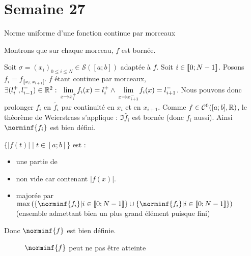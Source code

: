 \documentclass{article}
\renewenvironment{question_kholle}[2][ ]
{
	\subsection{\texorpdfstring{#2}{}}
	\notblank{#1}
	{
		\noindent #1
		\bigbreak
	}
	{}
	\begin{proof}
}
{
	\end{proof}
}
\begin{document}
\pagebreak\section{Semaine 27}

\begin{question_kholle}
  {Norme uniforme d'une fonction continue par morceaux}

  Montrons que sur chaque morceau, $f$ est bornée.

  Soit $\sigma = (x_i)_{0 \leqslant i \leqslant N} \in \mathcal{S}([a;b])$ adaptée à $f$.
  Soit $i \in [\![ 0; N-1 ]\!]$. Posons $f_i = f_{|]x_i;x_{i+1}[}$.
  $f$ étant continue par morceaux, $\exists (l_i^+, l_{i-1}^-) \in \mathbb R^2 : \lim\limits_{\;x \to x_i^+\;}\!\! f_i(x) = l_i^+ \wedge \lim\limits_{\;x \to x_{i+1}^-\;}\!\! f_i(x) = l_{i+1}^-$.
  Nous pouvons donc prolonger $f_i$ en $\tilde{f_i}$ par continuité en $x_i$ et en $x_{i+1}$.
  Comme $f \in \Cont{0}{[a;b]}{}$, le théorème de Weierstrass s'applique : $\Im \tilde{f_i}$ est bornée (donc $f_i$ aussi). Ainsi $\norminf{f_i}$ est bien défini.

  \noindent $\{ |f(t)| \;|\; t \in [a;b] \}$ est : \begin{itemize}
    \item une partie de \R
    \item non vide car contenant $|f(x)|$.
    \item majorée par $\max \left( \{\norminf{f_i} | i \in \lient 0; N-1 \rient\} \cup \{\norminf{f_i} | i \in \lient 0; N-1 \rient\} \right)$ (ensemble admettant bien un plus grand élément puisque fini)
  \end{itemize}
  Donc $\norminf{f}$ est bien définie.
  \begin{figure}[H]
    \centering
    \caption{$\norminf{f}$ peut ne pas être atteinte}
  \end{figure}
\end{question_kholle}
\end{document}
